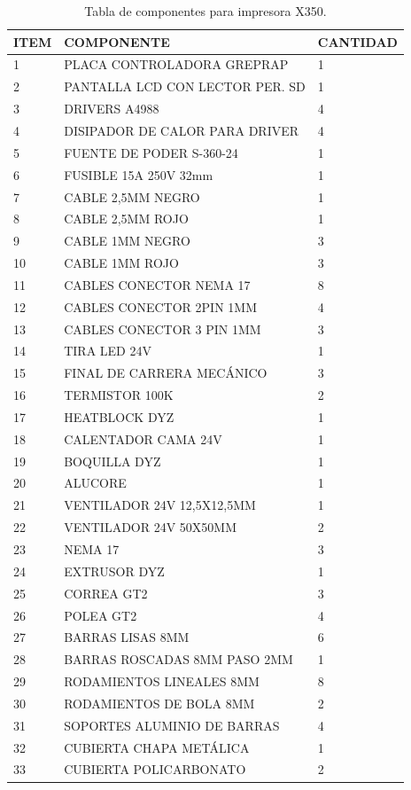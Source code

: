 \begin{table}[H]\centering


\begin{tabular}{|p{1cm}|p{8cm}|p{2cm}|}
\hline
\textbf{ITEM} &\textbf{COMPONENTE} &\textbf{CANTIDAD} \\ \hline
1 &PLACA CONTROLADORA GREPRAP &1 \\ \hline
2 &PANTALLA LCD CON LECTOR PER. SD &1 \\ \hline
3 &DRIVERS A4988 &4 \\ \hline
4 &DISIPADOR DE CALOR PARA DRIVER &4 \\ \hline
5 &FUENTE DE PODER S-360-24 &1 \\ \hline
6 &FUSIBLE 15A 250V 32mm &1 \\ \hline
7 &CABLE 2,5MM NEGRO &1 \\ \hline
8 &CABLE 2,5MM ROJO &1 \\ \hline
9 &CABLE 1MM NEGRO &3 \\ \hline
10 &CABLE 1MM ROJO &3 \\ \hline
11 &CABLES CONECTOR NEMA 17 &8 \\ \hline
12 &CABLES CONECTOR 2PIN 1MM &4 \\ \hline
13 &CABLES CONECTOR 3 PIN 1MM &3 \\ \hline
14 &TIRA LED 24V &1 \\ \hline
15 &FINAL DE CARRERA MECÁNICO &3 \\ \hline
16 &TERMISTOR 100K &2 \\ \hline
17 &HEATBLOCK DYZ &1 \\ \hline
18 &CALENTADOR CAMA 24V &1 \\ \hline
19 &BOQUILLA DYZ &1 \\ \hline
20 &ALUCORE &1 \\ \hline
21 &VENTILADOR 24V 12,5X12,5MM &1 \\ \hline
22 &VENTILADOR 24V 50X50MM &2 \\ \hline
23 &NEMA 17 &3 \\ \hline
24 &EXTRUSOR DYZ &1 \\ \hline
25 &CORREA GT2 &3 \\ \hline
26 &POLEA GT2 &4 \\ \hline
27 &BARRAS LISAS 8MM &6 \\ \hline
28 &BARRAS ROSCADAS 8MM PASO 2MM &1 \\
\hline
29 &RODAMIENTOS LINEALES 8MM &8 \\
\hline
30 &RODAMIENTOS DE BOLA 8MM &2 \\
\hline
31 &SOPORTES ALUMINIO DE BARRAS &4 \\
\hline
32 &CUBIERTA CHAPA METÁLICA &1 \\
\hline
33 &CUBIERTA POLICARBONATO &2 \\
\hline
\end{tabular}
\caption{Tabla de componentes para impresora X350.}
\end{table}

